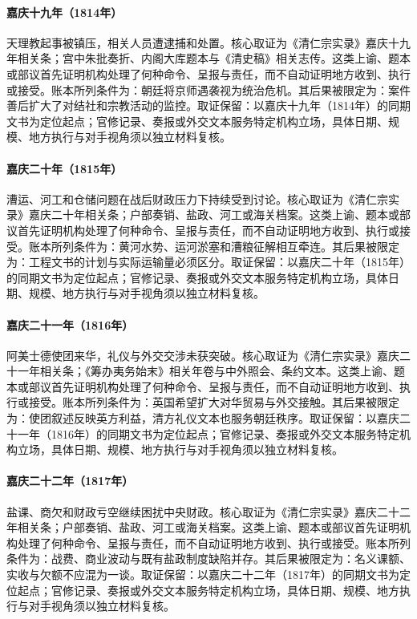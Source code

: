\hypertarget{ledger:EQ-1814-TIANLI-SUPPRESSION}{}\paragraph{嘉庆十九年（1814年）}天理教起事被镇压，相关人员遭逮捕和处置。核心取证为《清仁宗实录》嘉庆十九年相关条；宫中朱批奏折、内阁大库题本与《清史稿》相关志传。这类上谕、题本或部议首先证明机构处理了何种命令、呈报与责任，而不自动证明地方收到、执行或接受。账本所列条件为：朝廷将京师遇袭视为统治危机。其后果被限定为：案件善后扩大了对结社和宗教活动的监控。取证保留：以嘉庆十九年（1814年）的同期文书为定位起点；官修记录、奏报或外交文本服务特定机构立场，具体日期、规模、地方执行与对手视角须以独立材料复核。
\hypertarget{ledger:EQ-1815-GRAND-CANAL-REPAIRS}{}\paragraph{嘉庆二十年（1815年）}漕运、河工和仓储问题在战后财政压力下持续受到讨论。核心取证为《清仁宗实录》嘉庆二十年相关条；户部奏销、盐政、河工或海关档案。这类上谕、题本或部议首先证明机构处理了何种命令、呈报与责任，而不自动证明地方收到、执行或接受。账本所列条件为：黄河水势、运河淤塞和漕粮征解相互牵连。其后果被限定为：工程文书的计划与实际运输量必须区分。取证保留：以嘉庆二十年（1815年）的同期文书为定位起点；官修记录、奏报或外交文本服务特定机构立场，具体日期、规模、地方执行与对手视角须以独立材料复核。
\hypertarget{ledger:EQ-1816-AMHERST-MISSION}{}\paragraph{嘉庆二十一年（1816年）}阿美士德使团来华，礼仪与外交交涉未获突破。核心取证为《清仁宗实录》嘉庆二十一年相关条；《筹办夷务始末》相关年卷与中外照会、条约文本。这类上谕、题本或部议首先证明机构处理了何种命令、呈报与责任，而不自动证明地方收到、执行或接受。账本所列条件为：英国希望扩大对华贸易与外交接触。其后果被限定为：使团叙述反映英方利益，清方礼仪文本也服务朝廷秩序。取证保留：以嘉庆二十一年（1816年）的同期文书为定位起点；官修记录、奏报或外交文本服务特定机构立场，具体日期、规模、地方执行与对手视角须以独立材料复核。
\hypertarget{ledger:EQ-1817-SALT-ARREARS}{}\paragraph{嘉庆二十二年（1817年）}盐课、商欠和财政亏空继续困扰中央财政。核心取证为《清仁宗实录》嘉庆二十二年相关条；户部奏销、盐政、河工或海关档案。这类上谕、题本或部议首先证明机构处理了何种命令、呈报与责任，而不自动证明地方收到、执行或接受。账本所列条件为：战费、商业波动与既有盐政制度缺陷并存。其后果被限定为：名义课额、实收与欠额不应混为一谈。取证保留：以嘉庆二十二年（1817年）的同期文书为定位起点；官修记录、奏报或外交文本服务特定机构立场，具体日期、规模、地方执行与对手视角须以独立材料复核。
